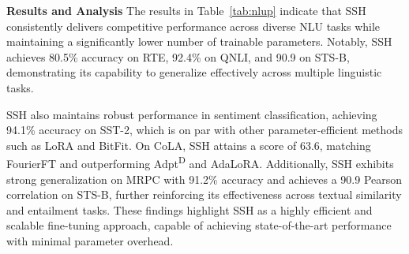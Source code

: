 \noindent \textbf{Results and Analysis} 
The results in Table~\ref{tab:nlup} indicate that SSH consistently delivers competitive performance across diverse NLU tasks while maintaining a significantly lower number of trainable parameters. Notably, SSH achieves 80.5\% accuracy on RTE, 92.4\% on QNLI, and 90.9 on STS-B, demonstrating its capability to generalize effectively across multiple linguistic tasks.

SSH also maintains robust performance in sentiment classification, achieving 94.1\% accuracy on SST-2, which is on par with other parameter-efficient methods such as LoRA and BitFit. On CoLA, SSH attains a score of 63.6, matching FourierFT and outperforming Adpt\textsuperscript{D} and AdaLoRA. Additionally, SSH exhibits strong generalization on MRPC with 91.2\% accuracy and achieves a 90.9 Pearson correlation on STS-B, further reinforcing its effectiveness across textual similarity and entailment tasks. These findings highlight SSH as a highly efficient and scalable fine-tuning approach, capable of achieving state-of-the-art performance with minimal parameter overhead.






